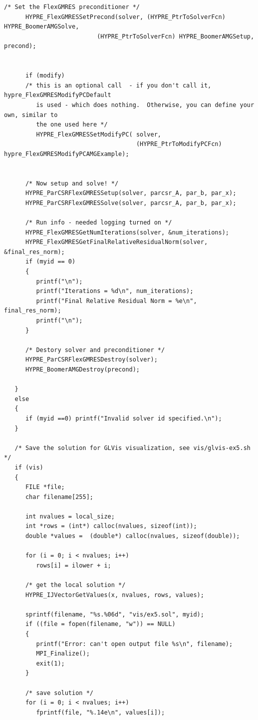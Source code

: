 \documentclass[a4paper,10pt]{article}
\numberwithin{figure}{section}
\numberwithin{table}{section}
\begin{document}
\begin{lstlisting}[frame=single, breaklines=true]
      /* Set the FlexGMRES preconditioner */
      HYPRE_FlexGMRESSetPrecond(solver, (HYPRE_PtrToSolverFcn) HYPRE_BoomerAMGSolve,
                          (HYPRE_PtrToSolverFcn) HYPRE_BoomerAMGSetup, precond);


      if (modify)
      /* this is an optional call  - if you don't call it, hypre_FlexGMRESModifyPCDefault
         is used - which does nothing.  Otherwise, you can define your own, similar to
         the one used here */
         HYPRE_FlexGMRESSetModifyPC( solver,
                                     (HYPRE_PtrToModifyPCFcn) hypre_FlexGMRESModifyPCAMGExample);


      /* Now setup and solve! */
      HYPRE_ParCSRFlexGMRESSetup(solver, parcsr_A, par_b, par_x);
      HYPRE_ParCSRFlexGMRESSolve(solver, parcsr_A, par_b, par_x);

      /* Run info - needed logging turned on */
      HYPRE_FlexGMRESGetNumIterations(solver, &num_iterations);
      HYPRE_FlexGMRESGetFinalRelativeResidualNorm(solver, &final_res_norm);
      if (myid == 0)
      {
         printf("\n");
         printf("Iterations = %d\n", num_iterations);
         printf("Final Relative Residual Norm = %e\n", final_res_norm);
         printf("\n");
      }

      /* Destory solver and preconditioner */
      HYPRE_ParCSRFlexGMRESDestroy(solver);
      HYPRE_BoomerAMGDestroy(precond);

   }
   else
   {
      if (myid ==0) printf("Invalid solver id specified.\n");
   }

   /* Save the solution for GLVis visualization, see vis/glvis-ex5.sh */
   if (vis)
   {
      FILE *file;
      char filename[255];

      int nvalues = local_size;
      int *rows = (int*) calloc(nvalues, sizeof(int));
      double *values =  (double*) calloc(nvalues, sizeof(double));

      for (i = 0; i < nvalues; i++)
         rows[i] = ilower + i;

      /* get the local solution */
      HYPRE_IJVectorGetValues(x, nvalues, rows, values);

      sprintf(filename, "%s.%06d", "vis/ex5.sol", myid);
      if ((file = fopen(filename, "w")) == NULL)
      {
         printf("Error: can't open output file %s\n", filename);
         MPI_Finalize();
         exit(1);
      }

      /* save solution */
      for (i = 0; i < nvalues; i++)
         fprintf(file, "%.14e\n", values[i]);


\end{lstlisting}
\end{document}
